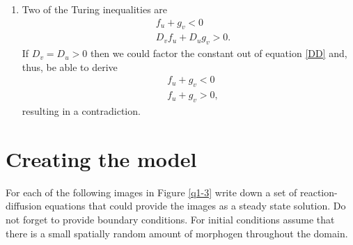 \documentclass[10pt]{article}
\newcommand{\fig}[1]{Figure \ref{#1}}
\newcommand{\eqn}[1]{equation \eqref{#1}}
\begin{document}
\begin{Answ}
\begin{enumerate}
\item Two of the Turing inequalities are
\begin{align}
&f_u+g_v<0\\
&D_vf_u+D_ug_v>0.\label{DD}
\end{align}
If $D_v=D_u>0$ then we could factor the constant out of \eqn{DD} and, thus, be able to derive
\begin{align}
&f_u+g_v<0\\
&f_u+g_v>0,
\end{align}
resulting in a contradiction.


\end{enumerate}
\end{Answ}


\section{Creating the model}
For each of the following images in \fig{q1-3} write down a set of reaction-diffusion equations that could provide the images as a steady state solution. Do not forget to provide boundary conditions. For initial conditions assume that there is a small spatially random amount of morphogen throughout the domain. 
\end{document}
